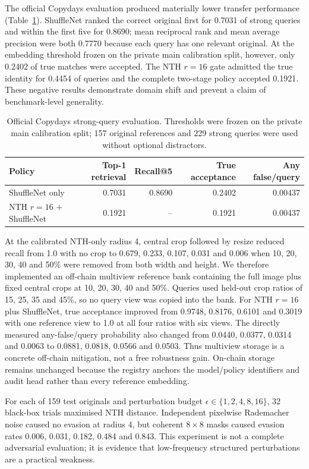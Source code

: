 \documentclass[12pt]{article}
\begin{document}
The official Copydays evaluation produced materially lower transfer performance (Table~\ref{tab:copydays}). ShuffleNet ranked the correct original first for 0.7031 of strong queries and within the first five for 0.8690; mean reciprocal rank and mean average precision were both 0.7770 because each query has one relevant original. At the embedding threshold frozen on the private main calibration split, however, only 0.2402 of true matches were accepted. The NTH $r=16$ gate admitted the true identity for 0.4454 of queries and the complete two-stage policy accepted 0.1921. These negative results demonstrate domain shift and prevent a claim of benchmark-level generality.

\begin{table}[ht]
\centering
\caption{Official Copydays strong-query evaluation. Thresholds were frozen on the private main calibration split; 157 original references and 229 strong queries were used without optional distractors.}
\label{tab:copydays}
\begin{tabular}{lrrrr}
\toprule
Policy & Top-1 retrieval & Recall@5 & True acceptance & Any false/query\\
\midrule
ShuffleNet only & 0.7031 & 0.8690 & 0.2402 & 0.00437\\
NTH $r=16$ + ShuffleNet & 0.1921 & -- & 0.1921 & 0.00437\\
\bottomrule
\end{tabular}
\end{table}

At the calibrated NTH-only radius 4, central crop followed by resize reduced recall from 1.0 with no crop to 0.679, 0.233, 0.107, 0.031 and 0.006 when 10, 20, 30, 40 and 50\% were removed from both width and height. We therefore implemented an off-chain multiview reference bank containing the full image plus fixed central crops at 10, 20, 30, 40 and 50\%. Queries used held-out crop ratios of 15, 25, 35 and 45\%, so no query view was copied into the bank. For NTH $r=16$ plus ShuffleNet, true acceptance improved from 0.9748, 0.8176, 0.6101 and 0.3019 with one reference view to 1.0 at all four ratios with six views. The directly measured any-false/query probability also changed from 0.0440, 0.0377, 0.0314 and 0.0063 to 0.0881, 0.0818, 0.0566 and 0.0503. Thus multiview storage is a concrete off-chain mitigation, not a free robustness gain. On-chain storage remains unchanged because the registry anchors the model/policy identifiers and audit head rather than every reference embedding.

For each of 159 test originals and perturbation budget $\epsilon\in\{1,2,4,8,16\}$, 32 black-box trials maximised NTH distance. Independent pixelwise Rademacher noise caused no evasion at radius 4, but coherent $8\times8$ masks caused evasion rates 0.006, 0.031, 0.182, 0.484 and 0.843. This experiment is not a complete adversarial evaluation; it is evidence that low-frequency structured perturbations are a practical weakness.
\end{document}
